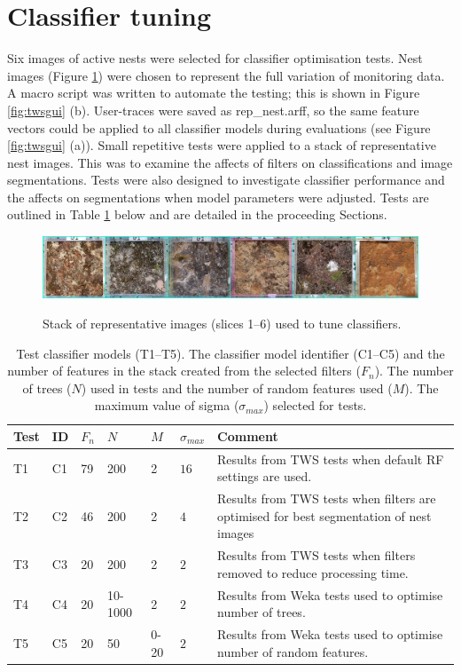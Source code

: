 \section{Classifier tuning}\label{sec:classifier-tuning}
Six images of active nests were selected for classifier optimisation tests. Nest images (Figure \ref{fig:repstack}) were chosen to represent the full variation of monitoring data. A macro script was written to automate the testing; this is shown in Figure \ref{fig:twsgui} (b). User-traces were saved as rep\_nest.arff, so the same feature vectors could be applied to all classifier models during evaluations (see Figure \ref{fig:twsgui} (a)). Small repetitive tests were applied to a stack of representative nest images. This was to examine the affects of filters on classifications and image segmentations. Tests were also designed to investigate classifier performance and the affects on segmentations when model parameters were adjusted. Tests are outlined in Table \ref{tab:test-classifier-models} below and are detailed in the proceeding Sections.

\begin{figure}[!htbp]\myfloatalign
\includegraphics[width=1\linewidth]{gfx5/train/1rf} \\
\caption[Stack of representative images.]{Stack of representative images (slices 1--6) used to tune classifiers.}\label{fig:repstack}
\end{figure}


\begin{table}[!htbp] \myfloatalign \caption[Test classifier models.]{Test classifier models (T1--T5). The classifier model identifier (C1--C5) and the number of features in the stack created from the selected filters ($F_{n}$). The number of trees ($N$) used in tests and the number of random features used ($M$). The maximum value of sigma ($\sigma_{max}$) selected for tests. }\label{tab:test-classifier-models} 
\begin{tabular}{llllllp{2in}} \\ \toprule
Test & ID & $ F_{n} $ & $ N $ & $ M $ & $\sigma_{max}$ & Comment \\ \midrule
T1& C1 & 79 & 200 & 2 & $ 16 $ & Results from \ac{TWS} tests when default \ac{RF} settings are used. \\
T2& C2 & 46 & 200 & 2 & $ 4 $ & Results from \ac{TWS} tests when filters are optimised for best segmentation of nest images\\
T3& C3 & 20 & 200 & 2 & $ 2 $ & Results from \ac{TWS} tests when filters removed to reduce processing time.\\
T4& C4 & 20 & 10-1000 & 2 & $ 2 $ & Results from \ac{Weka} tests used to optimise number of trees.\\
T5& C5 & 20 & 50 & 0-20 & $ 2 $ & Results from \ac{Weka} tests used to optimise number of random features.\\
\bottomrule
\end{tabular}
\end{table}

